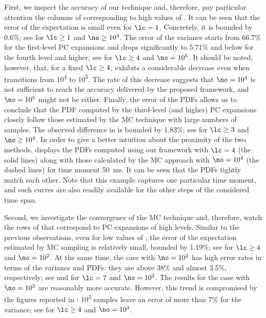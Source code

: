 First, we inspect the accuracy of our technique and, therefore, pay particular
attention the columns of  corresponding to
high values of \no. It can be seen that the error of the expectation is small
even for $\lc = 1$. Concretely, it is bounded by 0.6\%; see \error{\expectation}
for $\lc \geq 1$ and $\no \geq 10^4$. The error of the variance starts from
66.7\% for the first-level \ac{PC} expansions and drops significantly to 5.71\%
and below for the fourth level and higher; see \error{\variance} for $\lc \geq
4$ and $\no = 10^5$. It should be noted, however, that, for a fixed $\lc \geq
4$, \error{\variance} exhibits a considerable decrease even when \no transitions
from 10\textsuperscript{4} to 10\textsuperscript{5}. The rate of this decrease
suggests that $\no = 10^4$ is not sufficient to reach the accuracy delivered by
the proposed framework, and $\no = 10^5$ might not be either. Finally, the error
of the \acp{PDF} allows us to conclude that the \ac{PDF} computed by the
third-level (and higher) \ac{PC} expansions closely follow those estimated by
the \ac{MC} technique with large numbers of samples. The observed difference in
 is bounded by 1.83\%; see  for $\lc
\geq 3$ and $\no \geq 10^4$. In order to give a better intuition about the
proximity of the two methods,  displays the
\acp{PDF} computed using our framework with $\lc = 4$ (the solid lines) along
with those calculated by the \ac{MC} approach with $\no = 10^4$ (the dashed
lines) for time moment 50~ms. It can be seen that the \acp{PDF} tightly match
each other. Note that this example captures one particular time moment, and such
curves are also readily available for the other steps of the considered time
span.

Second, we investigate the convergence of the \ac{MC} technique and, therefore,
watch the rows of  that correspond to \ac{PC}
expansions of high levels. Similar to the previous observations, even for low
values of \no, the error of the expectation estimated by \ac{MC} sampling is
relatively small, bounded by 1.19\%; see \error{\expectation} for $\lc \geq 4$
and $\no = 10^2$. At the same time, the case with $\no = 10^2$ has high error
rates in terms of the variance and \acp{PDF}: they are above 38\% and almost
3.5\%, respectively; see \error{\variance} and  for $\lc = 7$ and $\no
= 10^2$. The results for the case with $\no = 10^3$ are reasonably more
accurate. However, this trend is compromised by the figures reported in
: 10\textsuperscript{3} samples leave an error
of more than 7\% for the variance; see \error{\variance} for $\lc \geq 4$ and
$\no = 10^3$.

